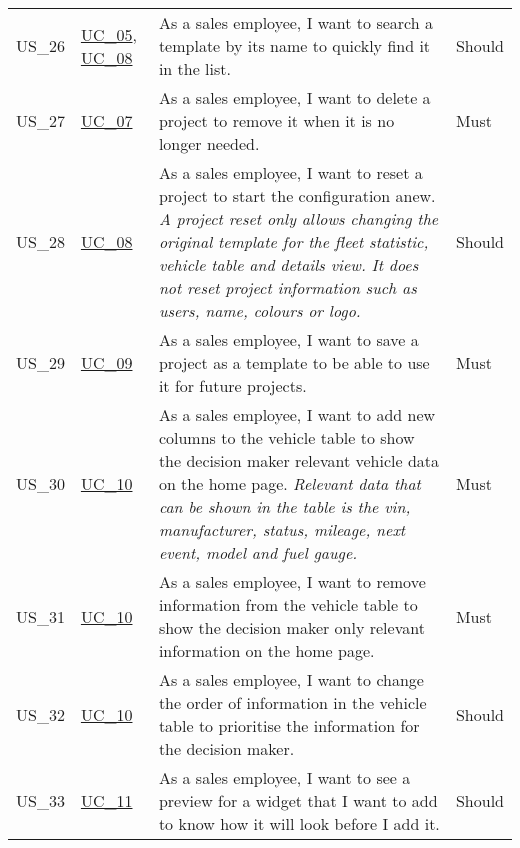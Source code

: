 \begin{footnotesize}
\begin{longtable}[L L L L]{ p{} p{} p{} p{} }
      \rowcolor{Gray}
      \hypertarget{Ref:US26}{US\_26} & \hyperlink{Ref:UC5}{UC\_05}, \newline \hyperlink{Ref:UC8}{UC\_08} & As a sales employee, I want to search a template by its name to quickly find it in the list. & Should \\
      
      \hypertarget{Ref:US27}{US\_27} & \hyperlink{Ref:UC7}{UC\_07} & As a sales employee, I want to delete a project to remove it when it is no longer needed. & Must \\
      
      \rowcolor{Gray}
      \hypertarget{Ref:US28}{US\_28} & \hyperlink{Ref:UC8}{UC\_08} & As a sales employee, I want to reset a project to start the configuration anew. 
      \newline
      \emph{A project reset only allows changing the original template for the fleet statistic, vehicle table and details view. It does not reset project information such as users, name, colours or logo.} & Should \\
      
      \hypertarget{Ref:US29}{US\_29} & \hyperlink{Ref:UC9}{UC\_09} & As a sales employee, I want to save a project as a template to be able to use it for future projects. & Must \\
      
      \rowcolor{Gray}
      \hypertarget{Ref:US30}{US\_30} & \hyperlink{Ref:UC10}{UC\_10} & As a sales employee, I want to add new columns to the vehicle table to show the decision maker relevant vehicle data on the home page.
      \newline
      \emph{Relevant data that can be shown in the table is the \gls{vin}, manufacturer, status, mileage, next event, model and fuel gauge.} & Must  \\
      
      \hypertarget{Ref:US31}{US\_31} & \hyperlink{Ref:UC10}{UC\_10} & As a sales employee, I want to remove information from the vehicle table to show the decision maker only relevant information on the home page. & Must  \\
      
      \rowcolor{Gray}
      \hypertarget{Ref:US32}{US\_32} & \hyperlink{Ref:UC10}{UC\_10} & As a sales employee, I want to change the order of information in the vehicle table to prioritise the information for the decision maker. & Should  \\

      \hypertarget{Ref:US33}{US\_33} & \hyperlink{Ref:UC11}{UC\_11} & As a sales employee, I want to see a preview for a \gls{widget} that I want to add to know how it will look before I add it. & Should \\
      

\end{longtable}
\end{footnotesize}

